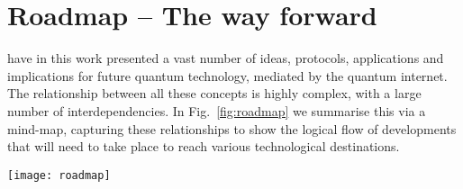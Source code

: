 %
%

\part{Roadmap -- The way forward}

 have in this work presented a vast number of ideas, protocols, applications and implications for future quantum technology, mediated by the quantum internet. The relationship between all these concepts is highly complex, with a large number of interdependencies. In Fig.~\ref{fig:roadmap} we summarise this via a mind-map, capturing these relationships to show the logical flow of developments that will need to take place to reach various technological destinations.

\begin{figure*}
	\texttt{[image: roadmap]}
	\caption{Relationships and dependencies in the development and deployment of the major concepts in the quantum internet.}\label{fig:roadmap}
\end{figure*}
